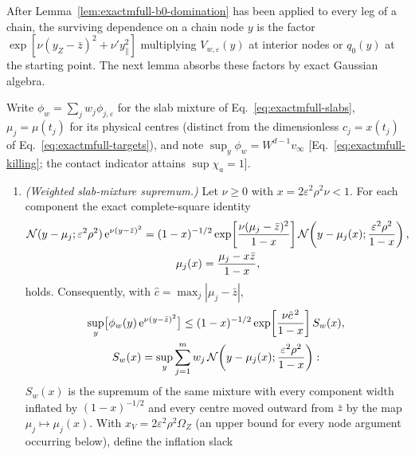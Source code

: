 After Lemma~\ref{lem:exactmfull-b0-domination} has been applied to every
leg of a chain, the surviving dependence on a chain node \(y\) is the
factor
\(\exp[\nu(y_Z-\bar z)^2+\nu'y_\parallel^2]\)
multiplying \(V_{w,\varepsilon}(y)\) at interior nodes or \(q_0(y)\) at the
starting point.  The next lemma absorbs these factors by exact Gaussian
algebra.

\begin{lemma}
\label{lem:exactmfull-b0-absorption}
Write \(\phi_w=\sum_jw_j\phi_{j,\varepsilon}\) for the slab mixture of
Eq.~\eqref{eq:exactmfull-slabs}, \(\mu_j=\mu(t_j)\) for its physical centres
(distinct from the dimensionless \(c_j=x(t_j)\) of
Eq.~\eqref{eq:exactmfull-targets}),
and note \(\sup_y\phi_w=W^{d-1}v_\infty\)
[Eq.~\eqref{eq:exactmfull-killing}; the contact indicator attains
\(\sup\chi_a=1\)].
\begin{enumerate}
\item[(a)] \emph{(Weighted slab-mixture supremum.)}
Let \(\nu\ge0\) with \(x=2\varepsilon^2\rho^2\nu<1\).  For each
component the exact complete-square identity
\begin{equation}
 \begin{gathered}
 \mathcal N(y-\mu_j;\varepsilon^2\rho^2)\,
 \mathrm e^{\nu(y-\bar z)^2}
 =(1-x)^{-1/2}
 \exp\!\left[\frac{\nu(\mu_j-\bar z)^2}{1-x}\right]
 \mathcal N\!\left(y-\mu_j(x);\frac{\varepsilon^2\rho^2}{1-x}\right),\\
 \mu_j(x)=\frac{\mu_j-x\bar z}{1-x},
 \end{gathered}
 \label{eq:exactmfull-b0-square}
\end{equation}
holds.  Consequently, with
\(\hat c=\max_j|\mu_j-\bar z|\),
\begin{equation}
 \begin{gathered}
 \sup_y\bigl[\phi_w(y)\,\mathrm e^{\nu(y-\bar z)^2}\bigr]
 \le(1-x)^{-1/2}
 \exp\!\left[\frac{\nu\hat c^{\,2}}{1-x}\right]
 S_w(x),\\
 S_w(x)=\sup_y\sum_{j=1}^m w_j\,
 \mathcal N\!\left(y-\mu_j(x);\frac{\varepsilon^2\rho^2}{1-x}\right):
 \end{gathered}
 \label{eq:exactmfull-b0-Sw}
\end{equation}
\(S_w(x)\) is the supremum of the same mixture with every component width
inflated by \((1-x)^{-1/2}\) and every centre moved outward from \(\bar z\)
by the map \(\mu_j\mapsto\mu_j(x)\).  With \(x_V=2\varepsilon^2\rho^2\Omega_Z\)
(an upper bound for every node argument occurring below), define the
inflation slack
\begin{equation}

\end{equation}
\end{enumerate}
\end{lemma}
